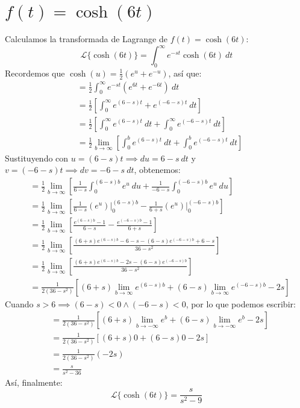 \documentclass[12pt, a4paper]{article}
\begin{document}
\section{\texorpdfstring{\(f(t)=\cosh(6t)\)}{f (t) = cosh (6t)}}

Calculamos la transformada de Lagrange de \(f(t) = \cosh(6t)\):
\[
	\mathcal{L}\{\cosh(6t)\} = \int_{0}^{\infty} e^{-st} \cosh(6t) \ dt
\]
Recordemos que \(\cosh(u) = \frac{1}{2} \left( e^{u} + e^{-u} \right) \), así que:
\begin{align*}
	&= \frac{1}{2} \int_{0}^{\infty} e^{-st} \left( e^{6t} + e^{-6t} \right)  \ dt \\
	&= \frac{1}{2} \left[ \int_{0}^{\infty} e^{(6-s)t} + e^{(-6-s)t} \ dt \right] \\
	&= \frac{1}{2} \left[ \int_{0}^{\infty} e^{(6-s)t} \ dt + \int_{0}^{\infty} e^{(-6-s)t} \ dt \right] \\
	&= \frac{1}{2} \lim_{b \to \infty} \left[ \int_{0}^{b} e^{(6-s)t} \ dt + \int_{0}^{b} e^{(-6-s)t} \ dt \right]
\end{align*}
Sustituyendo con \(u = (6-s)t \implies du = 6-s\ dt\) y \(v = (-6-s)t \implies dv = -6-s\ dt\), obtenemos:
\begin{align*}
	&= \frac{1}{2} \lim_{b \to \infty} \left[ \frac{1}{6-s} \int_{0}^{(6-s)b} e^{u} \ du + \frac{1}{-6-s} \int_{0}^{(-6-s)b} e^{u} \ du \right] \\
	&= \frac{1}{2} \lim_{b \to \infty} \left[ \frac{1}{6-s} \left. \left( e^{u} \right) \right|_{0}^{(6-s)b} - \frac{1}{6+s} \left. \left( e^{u} \right) \right|_{0}^{(-6-s)b} \right] \\
	&= \frac{1}{2} \lim_{b \to \infty} \left[ \frac{e^{(6-s)b} - 1}{6-s} - \frac{e^{(-6-s)b} - 1}{6+s} \right] \\
	&= \frac{1}{2} \lim_{b \to \infty} \left[ \frac{(6+s) e^{(6-s)b} - 6 - s - (6-s)e^{(-6-s)b} + 6 - s}{36 - s ^{2}} \right] \\
	&= \frac{1}{2} \lim_{b \to \infty} \left[ \frac{(6+s) e^{(6-s)b} - 2s - (6-s)e^{(-6-s)b}}{36-s ^{2}} \right] \\
	&= \frac{1}{2(36-s ^{2})} \left[ (6+s) \lim_{b \to \infty} e^{(6-s)b} + (6-s) \lim_{b \to \infty} e^{(-6-s)b} - 2s \right]
\end{align*}
Cuando \(s > 6 \implies (6-s) < 0 \land (-6-s) < 0\), por lo que podemos escribir:
\begin{align*}
	&= \frac{1}{2(36-s ^{2})} \left[ (6+s) \lim_{b \to -\infty} e^{b} + (6-s) \lim_{b \to -\infty} e^{b} - 2s \right] \\
	&= \frac{1}{2(36-s ^{2})} \left[ (6+s) 0 + (6-s) 0 - 2s \right] \\
	&= \frac{1}{2(36-s ^{2})} (-2s) \\
	&= \frac{s}{s ^{2} - 36}
\end{align*}
Así, finalmente:
\[
	\mathcal{L}\{\cosh(6t)\} = \frac{s}{s ^{2} - 9}
\]
\end{document}

